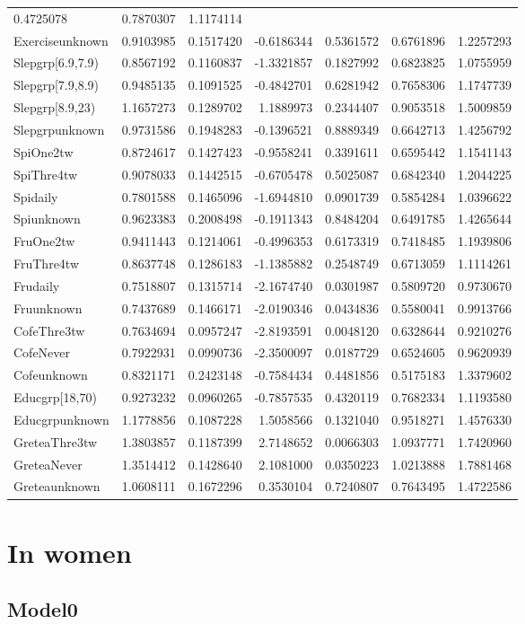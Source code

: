 \documentclass[]{article}
\begin{document}
\begin{longtable}[]{@{}lrrrrrr@{}}
0.4725078 & 0.7870307 & 1.1174114\tabularnewline
Exerciseunknown & 0.9103985 & 0.1517420 & -0.6186344 & 0.5361572 &
0.6761896 & 1.2257293\tabularnewline
Slepgrp{[}6.9,7.9) & 0.8567192 & 0.1160837 & -1.3321857 & 0.1827992 &
0.6823825 & 1.0755959\tabularnewline
Slepgrp{[}7.9,8.9) & 0.9485135 & 0.1091525 & -0.4842701 & 0.6281942 &
0.7658306 & 1.1747739\tabularnewline
Slepgrp{[}8.9,23) & 1.1657273 & 0.1289702 & 1.1889973 & 0.2344407 &
0.9053518 & 1.5009859\tabularnewline
Slepgrpunknown & 0.9731586 & 0.1948283 & -0.1396521 & 0.8889349 &
0.6642713 & 1.4256792\tabularnewline
SpiOne2tw & 0.8724617 & 0.1427423 & -0.9558241 & 0.3391611 & 0.6595442 &
1.1541143\tabularnewline
SpiThre4tw & 0.9078033 & 0.1442515 & -0.6705478 & 0.5025087 & 0.6842340
& 1.2044225\tabularnewline
Spidaily & 0.7801588 & 0.1465096 & -1.6944810 & 0.0901739 & 0.5854284 &
1.0396622\tabularnewline
Spiunknown & 0.9623383 & 0.2008498 & -0.1911343 & 0.8484204 & 0.6491785
& 1.4265644\tabularnewline
FruOne2tw & 0.9411443 & 0.1214061 & -0.4996353 & 0.6173319 & 0.7418485 &
1.1939806\tabularnewline
FruThre4tw & 0.8637748 & 0.1286183 & -1.1385882 & 0.2548749 & 0.6713059
& 1.1114261\tabularnewline
Frudaily & 0.7518807 & 0.1315714 & -2.1674740 & 0.0301987 & 0.5809720 &
0.9730670\tabularnewline
Fruunknown & 0.7437689 & 0.1466171 & -2.0190346 & 0.0434836 & 0.5580041
& 0.9913766\tabularnewline
CofeThre3tw & 0.7634694 & 0.0957247 & -2.8193591 & 0.0048120 & 0.6328644
& 0.9210276\tabularnewline
CofeNever & 0.7922931 & 0.0990736 & -2.3500097 & 0.0187729 & 0.6524605 &
0.9620939\tabularnewline
Cofeunknown & 0.8321171 & 0.2423148 & -0.7584434 & 0.4481856 & 0.5175183
& 1.3379602\tabularnewline
Educgrp{[}18,70) & 0.9273232 & 0.0960265 & -0.7857535 & 0.4320119 &
0.7682334 & 1.1193580\tabularnewline
Educgrpunknown & 1.1778856 & 0.1087228 & 1.5058566 & 0.1321040 &
0.9518271 & 1.4576330\tabularnewline
GreteaThre3tw & 1.3803857 & 0.1187399 & 2.7148652 & 0.0066303 &
1.0937771 & 1.7420960\tabularnewline
GreteaNever & 1.3514412 & 0.1428640 & 2.1081000 & 0.0350223 & 1.0213888
& 1.7881468\tabularnewline
Greteaunknown & 1.0608111 & 0.1672296 & 0.3530104 & 0.7240807 &
0.7643495 & 1.4722586\tabularnewline
\bottomrule
\end{longtable}

\hypertarget{in-women-3}{%
\section{In women}\label{in-women-3}}

\hypertarget{model0-7}{%
\subsection{Model0}\label{model0-7}}
\end{document}
